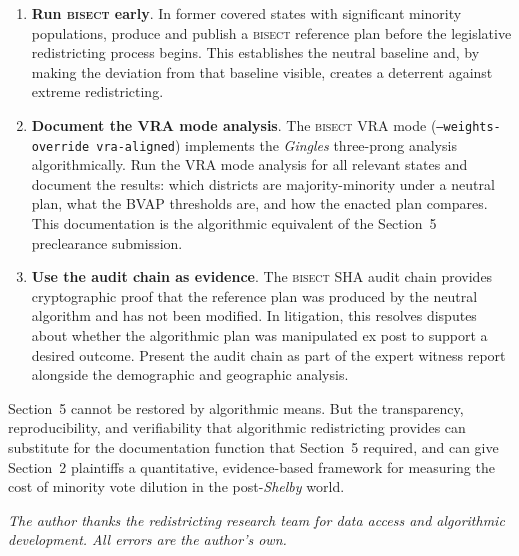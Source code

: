 \begin{enumerate}
\item \textbf{Run \textsc{bisect} early}. In former covered states with
  significant minority populations, produce and publish a \textsc{bisect}
  reference plan before the legislative redistricting process begins.
  This establishes the neutral baseline and, by making the deviation from
  that baseline visible, creates a deterrent against extreme redistricting.

\item \textbf{Document the VRA mode analysis}. The \textsc{bisect} VRA mode
  (\texttt{--weights-override vra-aligned}) implements the \textit{Gingles}
  three-prong analysis algorithmically. Run the VRA mode analysis for all
  relevant states and document the results: which districts are majority-minority
  under a neutral plan, what the BVAP thresholds are, and how the enacted
  plan compares. This documentation is the algorithmic equivalent of the
  Section~5 preclearance submission.

\item \textbf{Use the audit chain as evidence}. The \textsc{bisect} SHA
  audit chain provides cryptographic proof that the reference plan was
  produced by the neutral algorithm and has not been modified. In litigation,
  this resolves disputes about whether the algorithmic plan was manipulated
  ex post to support a desired outcome. Present the audit chain as part
  of the expert witness report alongside the demographic and geographic
  analysis.
\end{enumerate}

Section~5 cannot be restored by algorithmic means. But the transparency,
reproducibility, and verifiability that algorithmic redistricting provides
can substitute for the documentation function that Section~5 required,
and can give Section~2 plaintiffs a quantitative, evidence-based framework
for measuring the cost of minority vote dilution in the post-\textit{Shelby}
world.

\bigskip
\noindent\textit{The author thanks the redistricting research team for
data access and algorithmic development. All errors are the author's own.}
